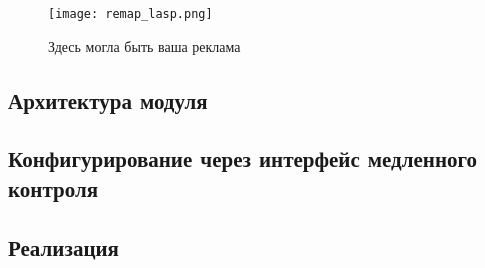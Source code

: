 
\begin{figure}[ht]
    \centering
    \texttt{[image: remap\_lasp.png]}
    \caption{Здесь могла быть ваша реклама}
    \label{fig:remap_lasp}
\end{figure}\par

\subsection{Архитектура модуля}


\subsection{Конфигурирование через интерфейс медленного контроля}


\subsection{Реализация}

